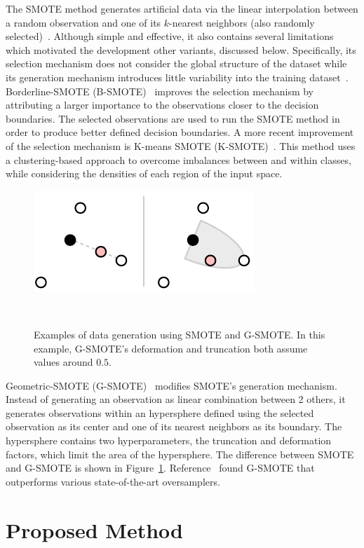 \documentclass[parskip=full]{scrartcl}
\begin{document}
The SMOTE method generates artificial data via the linear interpolation
between a random observation and one of its $k$-nearest neighbors (also
randomly selected)~\cite{Chawla2002}. Although simple and effective, it also
contains several limitations which motivated the development other variants,
discussed below. Specifically, its selection mechanism does not consider the
global structure of the dataset while its generation mechanism introduces
little variability into the training dataset~\cite{Douzas2019}.
Borderline-SMOTE (B-SMOTE)~\cite{Han2005} improves the selection mechanism by
attributing a larger importance to the observations closer to the decision
boundaries. The selected observations are used to run the SMOTE method in
order to produce better defined decision boundaries. A more recent improvement
of the selection mechanism is K-means SMOTE (K-SMOTE)~\cite{Douzas2018}. This
method uses a clustering-based approach to overcome imbalances between and
within classes, while considering the densities of each region of the input
space.

\begin{figure}[H]
	\centering
	\includegraphics[width=.5\linewidth]{../analysis/smote_vs_gsmote}
    \caption{%
        Examples of data generation using SMOTE and G-SMOTE\@. In this
        example, G-SMOTE's deformation and truncation both assume values
        around $0.5$.
    }~\label{fig:smote_vs_gsmote}
\end{figure}

Geometric-SMOTE (G-SMOTE)~\cite{Douzas2019} modifies SMOTE's generation
mechanism. Instead of generating an observation as linear combination between
2 others, it generates observations within an hypersphere defined using the
selected observation as its center and one of its nearest neighbors as its
boundary. The hypersphere contains two hyperparameters, the truncation and
deformation factors, which limit the area of the hypersphere. The difference
between SMOTE and G-SMOTE is shown in Figure~\ref{fig:smote_vs_gsmote}.
Reference~\cite{Douzas2019imbalanced} found G-SMOTE that outperforms various
state-of-the-art oversamplers.

\section{Proposed Method}~\label{sec:proposed_method}
\end{document}
